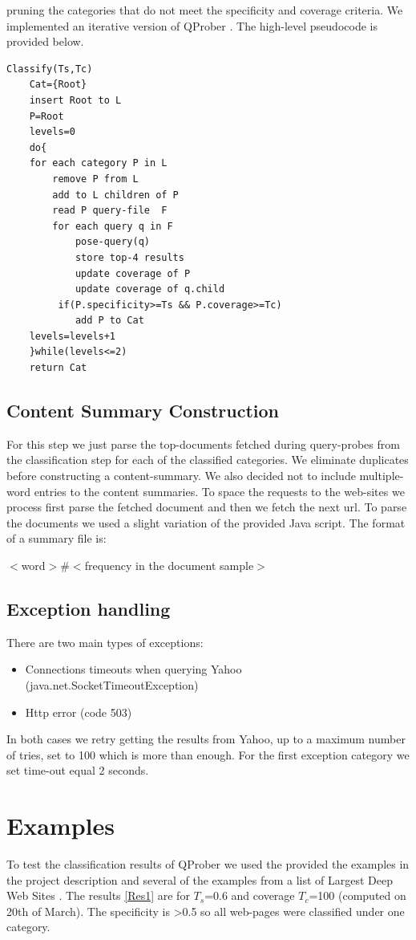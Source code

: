\documentclass[11pt]{article}
\begin{document}
pruning the categories that do not meet the specificity and coverage criteria. We implemented an iterative version of QProber \cite{QProb}. The high-level pseudocode is provided below.

\begin{verbatim}
Classify(Ts,Tc)
    Cat={Root}
    insert Root to L
    P=Root
    levels=0
    do{
    for each category P in L
        remove P from L
        add to L children of P
        read P query-file  F
        for each query q in F
            pose-query(q)
            store top-4 results
            update coverage of P 
            update coverage of q.child
         if(P.specificity>=Ts && P.coverage>=Tc)
            add P to Cat
    levels=levels+1
    }while(levels<=2)
    return Cat
\end{verbatim}

\subsection{Content Summary Construction}
For this step we just parse the top-documents fetched during query-probes from the classification step for each of the classified categories. We eliminate duplicates before constructing 
a content-summary. We also decided not to include multiple-word entries to the content summaries. To space the requests to the web-sites we process first parse the fetched document and then we fetch
the next url. To parse the documents we used a slight variation of the provided Java script. The format of a summary file is:

$<$word$>\#<$frequency in the document sample$>$

\subsection{Exception handling}
There are two main types of exceptions:

\begin{itemize}
\item Connections timeouts when querying Yahoo (java.net.SocketTimeoutException)
\item Http error (code 503)
\end{itemize}

In both cases we retry getting the results from Yahoo, up to a maximum number of tries, set to 100 which is more than enough. For the first exception category we set time-out equal 2 seconds.

\section{Examples}
To test the classification results of QProber we used the provided the examples in the project description and several of the examples from a list
of Largest Deep Web Sites \cite{AIP}. The results \ref{Res1} are for $T_s$=0.6 and coverage $T_c$=100  (computed on 20th of March). The specificity
is >0.5 so all web-pages were classified under one category.
\end{document}
